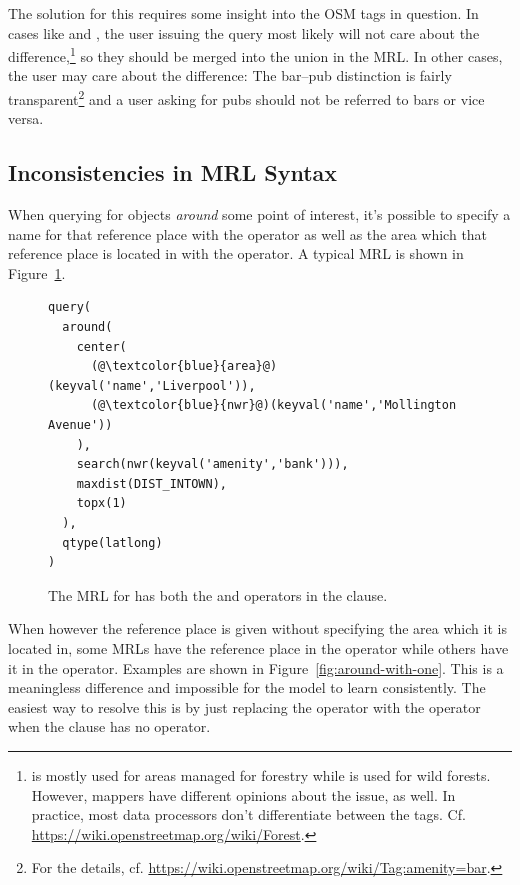 The solution for this requires some insight into the OSM tags in question. In
cases like  and , the user issuing
the query most likely will not care about the
difference,\footnote{ is mostly used for areas managed
  for forestry while  is used for wild forests. However,
  mappers have different opinions about the issue, as well. In practice, most
  data processors don’t differentiate between the tags. Cf.
  \url{https://wiki.openstreetmap.org/wiki/Forest}.} so they should be merged
into the union  in the MRL. In other
cases, the user may care about the difference: The bar--pub distinction is fairly
transparent\footnote{For the details, cf.
  \url{https://wiki.openstreetmap.org/wiki/Tag:amenity=bar}.} and a user asking
for pubs should not be referred to bars or vice versa.

\subsection{Inconsistencies in MRL Syntax}
\label{sec:mrl-inconsistencies}

When querying for objects \emph{around} some point of interest, it’s possible to
specify a name for that reference place with the  operator as well as
the area which that reference place is located in with the  operator.
A typical MRL is shown in Figure~\ref{fig:around-with-both}.

\begin{figure}[h]
  \centering
  \begin{lstlisting}[style=MyMRL]
query(
  around(
    center(
      (@\textcolor{blue}{area}@)(keyval('name','Liverpool')),
      (@\textcolor{blue}{nwr}@)(keyval('name','Mollington Avenue'))
    ),
    search(nwr(keyval('amenity','bank'))),
    maxdist(DIST_INTOWN),
    topx(1)
  ),
  qtype(latlong)
)
  \end{lstlisting}
  \caption{The MRL for  has
    both the  and  operators in the  clause.}
  \label{fig:around-with-both}
\end{figure}

When however the reference place is given without specifying the area which it
is located in, some MRLs have the reference place in the  operator
while others have it in the  operator. Examples are shown in
Figure~\ref{fig:around-with-one}. This is a meaningless difference and
impossible for the model to learn consistently. The easiest way to resolve this
is by just replacing the  operator with the  operator when
the  clause has no  operator.


